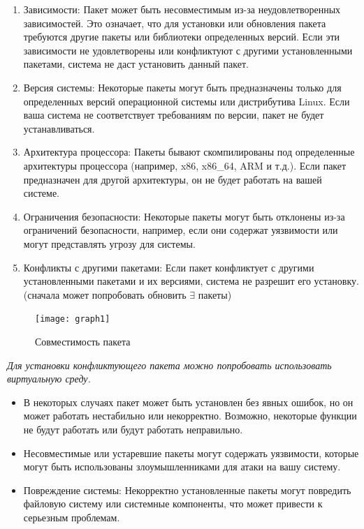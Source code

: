 \documentclass[oneside, final, 14pt]{extreport} %
\begin{document}
\begin{enumerate}
    \item Зависимости: Пакет может быть несовместимым из-за неудовлетворенных зависимостей. Это означает, что для установки или обновления пакета требуются другие пакеты или библиотеки определенных версий. Если эти зависимости не удовлетворены или конфликтуют с другими установленными пакетами, система не даст установить данный пакет.
    \item Версия системы: Некоторые пакеты могут быть предназначены только для определенных версий операционной системы или дистрибутива Linux. Если ваша система не соответствует требованиям по версии, пакет не будет устанавливаться.
    \item Архитектура процессора: Пакеты бывают скомпилированы под определенные архитектуры процессора (например, x86, x86\_64, ARM и т.д.). Если пакет предназначен для другой архитектуры, он не будет работать на вашей системе.
    \item Ограничения безопасности: Некоторые пакеты могут быть отклонены из-за ограничений безопасности, например, если они содержат уязвимости или могут представлять угрозу для системы.
    \item Конфликты с другими пакетами: Если пакет конфликтует с другими установленными пакетами и их версиями, система не разрешит его установку. (сначала может попробовать обновить $\exists$ пакеты)
\end{enumerate}

\begin{figure}
    \centering
    \texttt{[image: graph1]} %
    \caption{Совместимость пакета}
    \label{fig:основания}
\end{figure}



\textit{Для установки конфликтующего пакета можно попробовать использовать виртуальную среду.}

\begin{itemize}
    \item В некоторых случаях пакет может быть установлен без явных ошибок, но он может работать нестабильно или некорректно. Возможно, некоторые функции не будут работать или будут работать неправильно.
    \item Несовместимые или устаревшие пакеты могут содержать уязвимости, которые могут быть использованы злоумышленниками для атаки на вашу систему.
    \item Повреждение системы: Некорректно установленные пакеты могут повредить файловую систему или системные компоненты, что может привести к серьезным проблемам.
\end{itemize}
\end{document}
